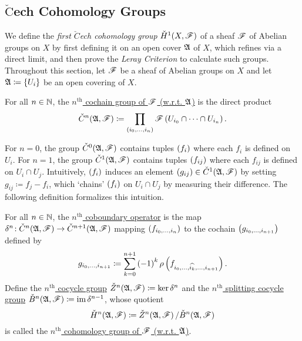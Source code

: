 \documentclass[../Moduli_Spaces_of_Riemann_Surfaces.tex]{subfiles}
\begin{document}
    \subsection{$\check{\textrm{C}}$ech Cohomology Groups}
    We define the \textit{first $\mathit{\check{C}}$\!ech cohomology group} $\check{H}^1\!\left(X,\mathscr{F}\right)$ of a sheaf $\mathscr{F}$ of Abelian groups on $X$ by first defining it on an open cover $\mathfrak{A}$ of $X$, which refines via a direct limit, and then prove the \textit{Leray Criterion} to calculate such groups. Throughout this section, let $\mathscr{F}$ be a sheaf of Abelian groups on $X$ and let $\mathfrak{A}\coloneqq\left\{U_i\right\}$ be an open covering of $X$.
    \begin{definition}
        For all $n\in\mathbb{N}$, the \ul{$n^\textrm{th}$ cochain group of $\mathscr{F}$ (w.r.t. $\mathfrak{A}$)} is the direct product
        \begin{equation*}
            \check{C}^n\!\left(\mathfrak{A},\mathscr{F}\right)\coloneqq\prod_{\left(i_0,\dots,i_n\right)}\mathscr{F}\left(U_{i_0}\cap\cdots\cap U_{i_n}\right).
        \end{equation*}
    \end{definition}
    \begin{remark}
        For $n=0$, the group $\check{C}^0\!\left(\mathfrak{A},\mathscr{F}\right)$ contains tuples $\left(f_i\right)$ where each $f_i$ is defined on $U_i$. For $n=1$, the group $\check{C}^1\!\left(\mathfrak{A},\mathscr{F}\right)$ contains tuples $\left(f_{ij}\right)$ where each $f_{ij}$ is defined on $U_i\cap U_j$. Intuitively, $\left(f_i\right)$ induces an element $\left(g_{ij}\right)\in\check{C}^1\!\left(\mathfrak{A},\mathscr{F}\right)$ by setting $g_{ij}\coloneqq f_j-f_i$, which `chains' $\left(f_i\right)$ on $U_i\cap U_j$ by measuring their difference. The following definition formalizes this intuition.\exqed
    \end{remark}
    \begin{definition}
        For all $n\in\mathbb{N}$, the \ul{$n^\textrm{th}$ coboundary operator} is the map $\delta^n\!:\check{C}^n\!\left(\mathfrak{A},\mathscr{F}\right)\to\check{C}^{n+1}\!\left(\mathfrak{A},\mathscr{F}\right)$ mapping $\left(f_{i_0,\dots,i_n}\right)$ to the cochain $\left(g_{i_0,\dots,i_{n+1}}\right)$ defined by\footnotemark
        \begin{equation*}
            g_{i_0,\dots,i_{n+1}}\coloneqq\sum_{k=0}^{n+1}\left(-1\right)^k\rho\left(f_{i_0,\dots,\widehat{i_k},\dots,i_{n+1}}\right).
        \end{equation*}
        Define the \ul{$n^\textrm{th}$ cocycle group} $\check{Z}^n\!\left(\mathfrak{A},\mathscr{F}\right)\coloneqq\ker\delta^n$ and the \ul{$n^\textrm{th}$ splitting cocycle group} $\check{B}^n\!\left(\mathfrak{A},\mathscr{F}\right)\coloneqq\operatorname{im}\delta^{n-1}$, whose quotient
        \begin{equation*}
            \check{H}^n\!\left(\mathfrak{A},\mathscr{F}\right)\coloneqq\check{Z}^n\!\left(\mathfrak{A},\mathscr{F}\right)/\check{B}^n\!\left(\mathfrak{A},\mathscr{F}\right)
        \end{equation*}
        is called the \ul{$n^\textrm{th}$ cohomology group of $\mathscr{F}$ (w.r.t. $\mathfrak{A}$)}.
    \end{definition}
\end{document}
